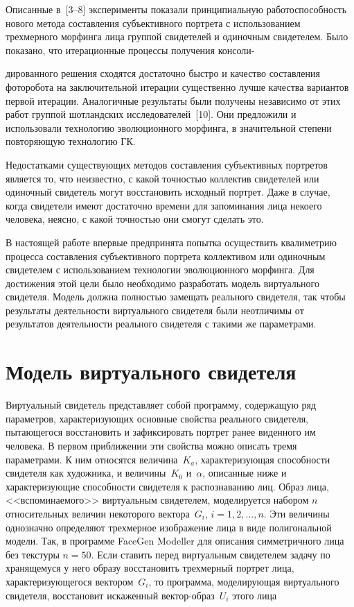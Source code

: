 \begin{multicols}{2}
     Описанные в~[3--8] эксперименты показали принципиальную 
работоспособность нового метода составления субъективного портрета с 
использованием трехмерного морфинга лица группой свидетелей и одиночным 
свидетелем. Было показано, что итерационные процессы получения 
консоли-\linebreak\vspace*{-12pt}
\pagebreak

\noindent
дированного решения сходятся достаточно быстро и качество 
составления фоторобота на заключительной итерации существенно лучше 
качества вариантов первой итерации. Аналогичные результаты были получены 
независимо от этих работ группой шотландских исследователей~[10]. Они 
предложили и использовали технологию эволюционного морфинга, в 
значительной степени повторяющую технологию ГК. 
     
     Недостатками существующих методов составления субъективных 
портретов является то, что неизвестно, с какой точностью коллектив 
свидетелей или одиночный свидетель могут восстановить исходный портрет. 
Даже в случае, когда свидетели имеют достаточно времени для запоминания 
лица некоего человека, неясно, с какой точностью они смогут сделать это. 
     
      В настоящей работе впервые предпринята попытка осуществить 
квалиметрию процесса со\-ставления субъективного портрета коллективом или 
одиночным свидетелем с использованием технологии эволюционного 
морфинга. Для дости\-жения этой цели было необходимо разработать модель 
виртуального свидетеля. Модель должна %
пол\-ностью замещать реального 
свидетеля, так чтобы результаты деятельности виртуального свидетеля были 
неотличимы от результатов деятельности реального свидетеля с такими же 
параметрами.
     
\section{Модель виртуального свидетеля}
     
     Виртуальный свидетель представляет собой программу, содержащую ряд 
параметров, характеризующих основные свойства реального свидетеля, 
пытающегося восстановить и зафиксировать портрет ранее виденного им 
человека. В первом приближении эти свойства можно описать тремя 
параметрами. К ним относятся величина~$K_a$, характеризующая способности 
свидетеля как художника, и величины~$K_0$ и~$\alpha$, описанные ниже и 
характеризующие способности свидетеля к распознаванию лиц. Образ лица, 
<<вспоминаемого>> виртуальным свидетелем, моделируется набором $n$ 
относительных величин некоторого вектора~$G_i$, $i = 1, 2, \ldots , n$. Эти 
величины однозначно определяют трехмерное изображение лица в виде 
полигональной модели. Так, в программе FaceGen Modeller для описания 
симметричного лица без текстуры $n = 50$. Если ставить перед виртуальным 
свидетелем задачу по хранящемуся у него образу восстановить трехмерный 
портрет лица, характеризующегося вектором~$G_i$, то программа, 
моделирующая виртуального свидетеля, восстановит искаженный 
век\-тор-об\-раз~$U_i$ этого лица


\end{multicols}
